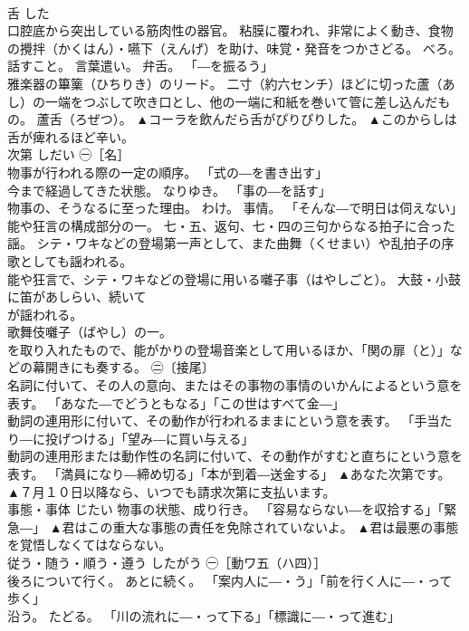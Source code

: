 \documentclass[8pt]{extreport}
\begin{document}
\begin{CJK}{UTF8}{min}
\\	舌	した	
\\	口腔底から突出している筋肉性の器官。 粘膜に覆われ、非常によく動き、食物の攪拌（かくはん）・嚥下（えんげ）を助け、味覚・発音をつかさどる。 べろ。 
\\	話すこと。 言葉遣い。 弁舌。 「―を振るう」 
\\	雅楽器の篳篥（ひちりき）のリード。 二寸（約六センチ）ほどに切った蘆（あし）の一端をつぶして吹き口とし、他の一端に和紙を巻いて管に差し込んだもの。 蘆舌（ろぜつ）。	▲コーラを飲んだら舌がぴりぴりした。 ▲このからしは舌が痺れるほど辛い。
\\	次第	しだい	㊀［名］ 
\\	物事が行われる際の一定の順序。 「式の―を書き出す」 
\\	今まで経過してきた状態。 なりゆき。 「事の―を話す」 
\\	物事の、そうなるに至った理由。 わけ。 事情。 「そんな―で明日は伺えない」 
\\	能や狂言の構成部分の一。 七・五、返句、七・四の三句からなる拍子に合った謡。 シテ・ワキなどの登場第一声として、また曲舞（くせまい）や乱拍子の序歌としても謡われる。 
\\	能や狂言で、シテ・ワキなどの登場に用いる囃子事（はやしごと）。 大鼓・小鼓に笛があしらい、続いて 
\\	が謡われる。 
\\	歌舞伎囃子（ばやし）の一。 
\\	を取り入れたもので、能がかりの登場音楽として用いるほか、「関の扉（と）」などの幕開きにも奏する。 ㊁〔接尾〕 
\\	名詞に付いて、その人の意向、またはその事物の事情のいかんによるという意を表す。 「あなた―でどうともなる」「この世はすべて金―」 
\\	動詞の連用形に付いて、その動作が行われるままにという意を表す。 「手当たり―に投げつける」「望み―に買い与える」 
\\	動詞の連用形または動作性の名詞に付いて、その動作がすむと直ちにという意を表す。 「満員になり―締め切る」「本が到着―送金する」	▲あなた次第です。 ▲７月１０日以降なら、いつでも請求次第に支払います。
\\	事態・事体	じたい	物事の状態、成り行き。 「容易ならない―を収拾する」「緊急―」	▲君はこの重大な事態の責任を免除されていないよ。 ▲君は最悪の事態を覚悟しなくてはならない。
\\	従う・随う・順う・遵う	したがう	㊀［動ワ五（ハ四）］ 
\\	後ろについて行く。 あとに続く。 「案内人に―・う」「前を行く人に―・って歩く」 
\\	沿う。 たどる。 「川の流れに―・って下る」「標識に―・って進む」 

\end{CJK}
\end{document}
